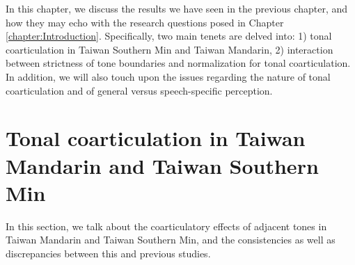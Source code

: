 \documentclass[12pt]{report}
\begin{document}
\begin{CJK}{UTF8}{bsmi}
In this chapter, we discuss the results we have seen in the previous chapter, and how they may echo with the research questions posed in Chapter \ref{chapter:Introduction}. Specifically, two main tenets are delved into: 1) tonal coarticulation in Taiwan Southern Min and Taiwan Mandarin, 2) interaction between strictness of tone boundaries and normalization for tonal coarticulation. In addition, we will also touch upon the issues regarding the nature of tonal coarticulation and of general versus speech-specific perception.

\section{Tonal coarticulation in Taiwan Mandarin and Taiwan Southern Min}

In this section, we talk about the coarticulatory effects of adjacent tones in Taiwan Mandarin and Taiwan Southern Min, and the consistencies as well as discrepancies between this and previous studies.


\end{CJK}
\end{document}
